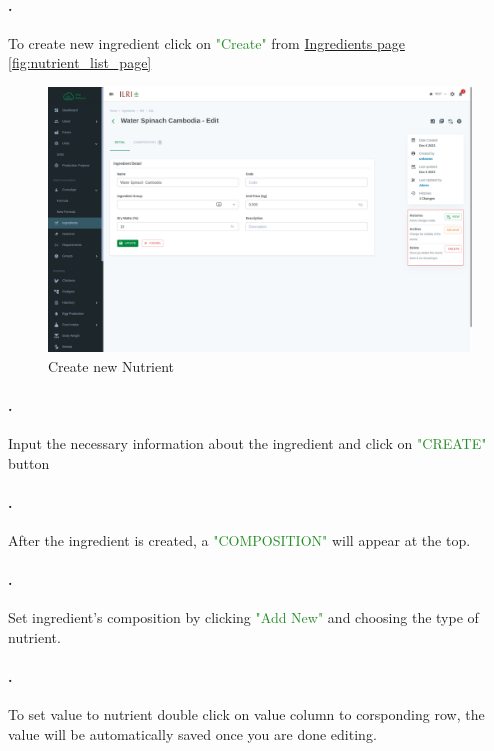 \paragraph{.}To create new ingredient click on \textcolor{ForestGreen}{"Create"} from \hyperref[fig:ingredient_list_page]{Ingredients page \ref{fig:nutrient_list_page}}
\begin{figure}[h!]
  	\includegraphics[width=15cm]{screenshots/ingredient_edit_page.png}
  	\caption{Create new Nutrient }
  	\label{fig:nutrient_create_page}
\end{figure}

\paragraph{.} Input the necessary information about the ingredient and click on \textcolor{ForestGreen}{"CREATE"} button
\paragraph{.} After the ingredient is created, a \textcolor{ForestGreen}{"COMPOSITION"} will appear at the top.
\paragraph{.} Set ingredient's composition by clicking \textcolor{ForestGreen}{"Add New"} and choosing the type of nutrient.
\paragraph{.} To set value to nutrient double click on value column to corsponding row, the value will be automatically saved once you are done editing.